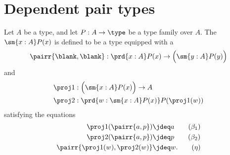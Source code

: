 \section{Dependent pair types}

\begin{defn}
Let $A$ be a type, and let $P:A\to\type$ be a type family over $A$.
The  $\sm{x:A}P(x)$ is defined to be a type equipped with a 
\begin{equation*}
\pairr{\blank,\blank}:\prd{x:A} P(x)\to \Big(\sm{y:A}P(y)\Big)
\end{equation*}
and 
\begin{align*}
\proj 1 & : \Big(\sm{x:A}P(x)\Big)\to A \\
\proj 2 & : \prd{w:\sm{x:A}P(x)}P(\proj 1(w))
\end{align*}
satisfying the equations
\begin{align*}
\proj 1(\pairr{a,p}) & \jdeq a \tag{$\beta_1$}\\
\proj 2(\pairr{a,p}) & \jdeq p \tag{$\beta_2$}\\
\pairr{\proj 1(w),\proj 2(w)} & \jdeq w. \tag{$\eta$}
\end{align*}
\end{defn}
